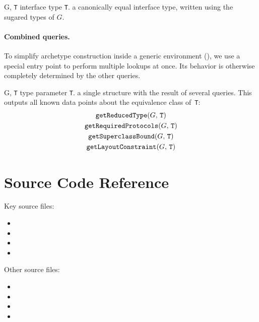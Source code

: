\documentclass[../generics]{subfiles}
\begin{document}
\begin{itemize}
{G, \texttt{T}}
{interface type \texttt{T}.}
{a canonically equal interface type, written using the sugared types of $G$.}
{}
\end{itemize}

\paragraph{Combined queries.} To simplify archetype construction inside a generic environment (), we use a special entry point to perform multiple lookups at once. Its behavior is otherwise completely determined by the other queries.

\begin{itemize}
{G, \texttt{T}}
{type parameter \texttt{T}.}
{a single structure with the result of several queries.}
{This outputs all known data points about the equivalence class of~\texttt{T}:
\begin{gather*}
\texttt{getReducedType}(G,\,\texttt{T})\\
\texttt{getRequiredProtocols}(G,\,\texttt{T})\\
\texttt{getSuperclassBound}(G,\,\texttt{T})\\
\texttt{getLayoutConstraint}(G,\,\texttt{T})
\end{gather*}}
\end{itemize}

\section{Source Code Reference}\label{genericsigsourceref}

Key source files:
\begin{itemize}
\item {}
\item {}
\item {}
\item {}
\end{itemize}
Other source files:
\begin{itemize}
\item {}
\item {}
\item {}
\item {}
\end{itemize}
\end{document}
